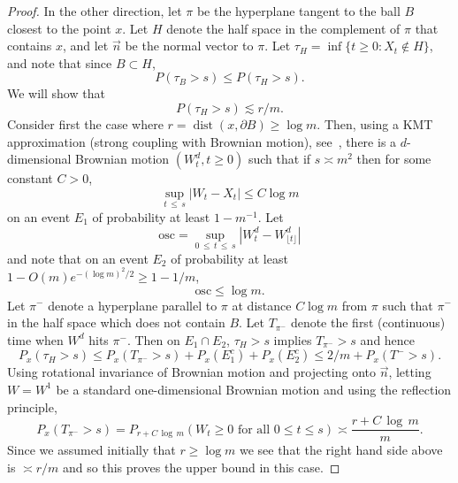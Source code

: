 \documentclass[10pt]{amsart}
\theoremstyle{definition}\newtheorem{defi}[theo]{Definition}\newtheorem{rema}[theo]{Remark}\newtheorem{exam}[theo]{Example}\newtheorem{exem}[theo]{Example}\newtheorem{nota}[theo]{Notation}
\DeclareMathOperator{\dist}{dist}
\newcommand{\Pmh}{P}
\begin{document}
\begin{proof}
In the other direction, let $\pi$ be the hyperplane tangent to the ball $B$ closest to the point $x$. Let $H$ denote the half space in the complement of $\pi$ that contains $x$, and let $\vec{n}$ be the normal vector to $\pi$. Let $\tau_{H} = \inf\{t \ge 0: X_t \notin H\}$, and note that since $B \subset H$,
\[
\Pmh(\tau_B>s) \le \Pmh(\tau_H >s).
\]
We will show that
\begin{equation}\label{Tplane}
\Pmh(\tau_H > s) \lesssim r/ m.
\end{equation}
Consider first the case where $r = \dist (x, \partial B) \ge \log m$. Then, using a KMT approximation (strong coupling with Brownian motion), see~\cite[Theorem~7.1.1]{LL}, there is a $d$-dimensional Brownian motion $(W^d_t, t \ge 0)$ such that if $s \asymp m^2$ then for some constant $C>0$,
\[
\sup_{t\,\le\,s} |W_t - X_t | \le C \log m
\]
on an event $E_1$ of probability at least $ 1- m^{-1}$.
Let
\[
\text{osc} = \sup_{0\,\le\,t\,\le\,s} \left|W^d_t - W^d_{\lfloor t \rfloor}\right|
\]
and note that on an event $E_2$ of probability at least $ 1- O(m) e^{ - (\log m)^2/2} \ge 1- 1/m$,
\[
\text{osc} \le \log m.
\]
Let $\pi^-$ denote a hyperplane parallel to $\pi$ at distance $C\log m$ from $\pi$ such that $\pi^-$ in the half space which does not contain $B$. Let $T_{\pi^-}$ denote the first (continuous) time when $W^d$ hits $\pi^-$. Then on $E_1 \cap E_2$, $\tau_H > s$ implies $T_{\pi^-} > s$ and hence
\[
\Pmh_x(\tau_H>s) \le \Pmh_x(T_{\pi^-} >s) + \Pmh_x(E_1^c) + \Pmh_x(E_2^c) \le 2/m + \Pmh_x(T^- >s).
\]
Using rotational invariance of Brownian motion and projecting onto $\vec{n}$, letting $W= W^1$ be a standard one-dimensional Brownian motion and using the reflection principle,
\[
\Pmh_x(T_{\pi^-} >s) = \Pmh_{r + C\,\log\,m} (W_t \ge 0 \text{ for all } 0\le t \le s)\asymp \frac{r+ C\,\log \,m}{m}.
\]
Since we assumed initially that $ r \ge \log m$ we see that the right hand side above is $\asymp r/m$ and so this proves the upper bound in this case.


\end{proof}
\end{document}
